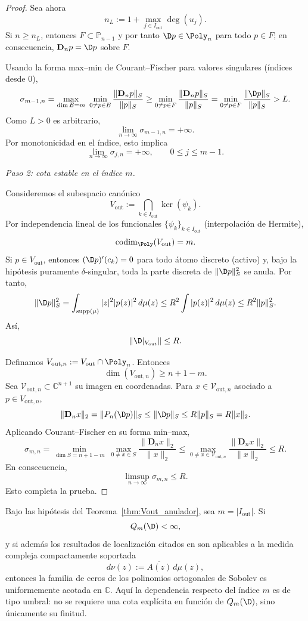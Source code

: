 \begin{proof}
	Sea ahora
	\[
		n_L:=1+\max_{j\in I_{\mathrm{out}}}\deg(u_j).
	\]
	Si $n\ge n_L$, entonces $F\subset\mathbb P_{n-1}$ y por tanto
	$\D p\in\Poly_n$ para todo $p\in F$; en consecuencia,
	$\mathbf D_n p=\D p$ sobre $F$.

	Usando la forma max--min de Courant--Fischer para valores singulares (índices desde $0$),
	\[
		\sigma_{m-1,n}
		=
		\max_{\dim E=m}\ \min_{0\ne p\in E}\frac{\|\mathbf D_np\|_S}{\|p\|_S}
		\ge
		\min_{0\ne p\in F}\frac{\|\mathbf D_np\|_S}{\|p\|_S}
		=
		\min_{0\ne p\in F}\frac{\|\D p\|_S}{\|p\|_S}
		> L.
	\]
	Como $L>0$ es arbitrario,
	\[
		\lim_{n\to\infty}\sigma_{m-1,n}=+\infty.
	\]
	Por monotonicidad en el índice, esto implica
	\[
		\lim_{n\to\infty}\sigma_{j,n}=+\infty,
		\qquad 0\le j\le m-1.
	\]

	\medskip
	\noindent
	\emph{Paso 2: cota estable en el índice $m$.}

	Consideremos el subespacio canónico
	\[
		V_{\mathrm{out}}:=\bigcap_{k\in I_{\mathrm{out}}}\ker(\psi_k).
	\]
	Por independencia lineal de los funcionales $\{\psi_k\}_{k\in I_{\mathrm{out}}}$
	(interpolación de Hermite),
	\[
		\operatorname{codim}_{\Poly}(V_{\mathrm{out}})=m.
	\]
	Si $p\in V_{\mathrm{out}}$, entonces $(\D p)'(c_k)=0$ para todo átomo discreto
	(activo) y, bajo la hipótesis puramente $\delta$-singular, toda la parte discreta de
	$\|\D p\|_S^2$ se anula. Por tanto,
	\[
		\|\D p\|_S^2
		=
		\int_{\operatorname{supp}(\mu)}|z|^2|p(z)|^2\,d\mu(z)
		\le
		R^2\int |p(z)|^2\,d\mu(z)
		\le
		R^2\|p\|_S^2.
	\]
	Así,
	\[
		\|\D|_{V_{\mathrm{out}}}\|\le R.
	\]

	Definamos $V_{\mathrm{out},n}:=V_{\mathrm{out}}\cap\Poly_n$. Entonces
	\[
		\dim(V_{\mathrm{out},n})\ge n+1-m.
	\]
	Sea $\mathcal V_{\mathrm{out},n}\subset\mathbb C^{n+1}$ su imagen en coordenadas.
	Para $x\in\mathcal V_{\mathrm{out},n}$ asociado a $p\in V_{\mathrm{out},n}$,
	\[
		\|\mathbf D_nx\|_2
		=
		\|P_n(\D p)\|_S
		\le
		\|\D p\|_S
		\le
		R\|p\|_S
		=
		R\|x\|_2.
	\]
	Aplicando Courant--Fischer en su forma min--max,
	\[
		\sigma_{m,n}
		=
		\min_{\dim S=n+1-m}\ \max_{0\ne x\in S}\frac{\|\mathbf D_nx\|_2}{\|x\|_2}
		\le
		\max_{0\ne x\in\mathcal V_{\mathrm{out},n}}\frac{\|\mathbf D_nx\|_2}{\|x\|_2}
		\le R.
	\]
	En consecuencia,
	\[
		\limsup_{n\to\infty}\sigma_{m,n}\le R.
	\]
	Esto completa la prueba.
\end{proof}

\begin{thm}\label{thm:criterio_singular_ceros_objetivo}
	Bajo las hipótesis del Teorema~\ref{thm:Vout_anulador}, sea $m=|I_{\mathrm{out}}|$. Si
	\[
		Q_m(\D)<\infty,
	\]
	y si además los resultados de localización citados en
	\cite{lopez1999zero,lopez2001sobolev,marcellan2015sobolev} son aplicables a la
	medida compleja compactamente soportada
	\[
		d\nu(z):=\overline{A(z)}\,d\mu(z),
	\]
	entonces la familia de ceros de los polinomios ortogonales de Sobolev es uniformemente acotada en $\mathbb C$.
	Aquí la dependencia respecto del índice $m$ es de tipo umbral: no se requiere una cota explícita en función de $Q_m(\D)$, sino únicamente su finitud.
\end{thm}

